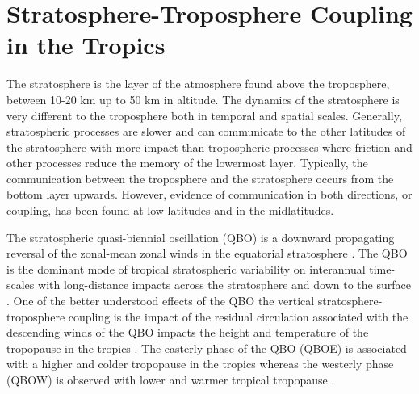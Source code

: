 

 
 
 





\section{Stratosphere-Troposphere Coupling in the Tropics}\label{sq:qbolit}


The stratosphere is the layer of the atmosphere found above the troposphere, between 10-20 km up to 50 km in altitude. 
The dynamics of the stratosphere is very different to the troposphere both in temporal and spatial scales. Generally, stratospheric processes are slower and can communicate to the other latitudes of the stratosphere with more impact than tropospheric processes where friction and other processes reduce the memory of the lowermost layer. 
Typically, the communication between the troposphere and the stratosphere occurs from the bottom layer upwards. 
However, evidence of communication in both directions, or coupling, has been found at low latitudes and in the midlatitudes. 


The stratospheric quasi-biennial oscillation (QBO) is a downward propagating reversal of the zonal-mean zonal winds in the equatorial stratosphere \citep{baldwin2001}. The QBO is the dominant mode of tropical stratospheric variability on interannual time-scales with long-distance impacts across the stratosphere \citep{holton1980,lu2020} and down to the surface \citep{gray2018}. 
One of the better understood effects of the QBO the vertical stratosphere-troposphere coupling is the impact of the residual circulation associated with the descending winds of the QBO impacts the height and temperature of the tropopause in the tropics \citep{baldwin2001,tegtmeier2020,tegtmeier2020b}. 
The easterly phase of the QBO (QBOE) is associated with a higher and colder tropopause in the tropics whereas the westerly phase (QBOW) is observed with lower and warmer tropical tropopause \citep{tegtmeier2020}. %

